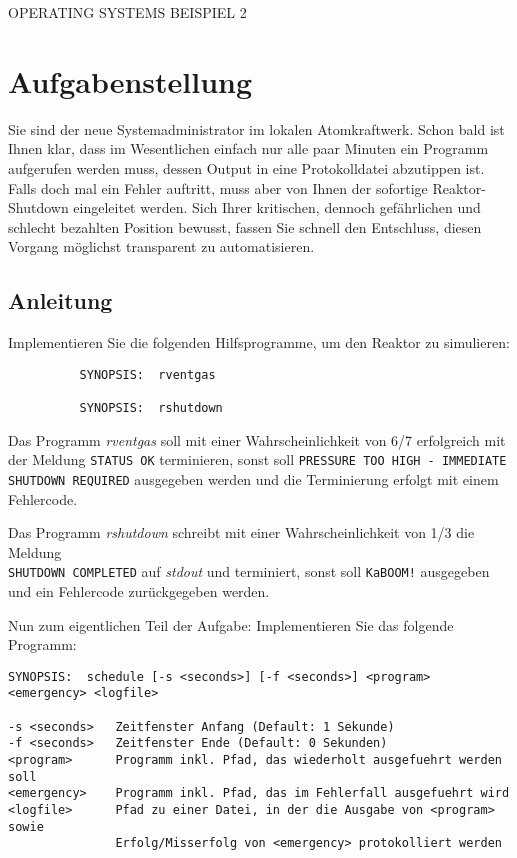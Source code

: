 \documentclass{article}
\begin{document}
\begin{center}
\begin{Large}
OPERATING SYSTEMS BEISPIEL 2
\end{Large}
\end{center}
\section*{Aufgabenstellung}

Sie sind der neue Systemadministrator im lokalen Atomkraftwerk. Schon bald ist
Ihnen klar, dass im Wesentlichen einfach nur alle paar Minuten ein Programm
aufgerufen werden muss, dessen Output in eine Protokolldatei abzutippen ist.
Falls doch mal ein Fehler auftritt, muss aber von Ihnen der sofortige
Reaktor-Shutdown eingeleitet werden. Sich Ihrer kritischen, dennoch gefährlichen
und schlecht bezahlten Position bewusst, fassen Sie schnell den Entschluss,
diesen Vorgang möglichst transparent zu automatisieren.

\subsection*{Anleitung}
Implementieren Sie die folgenden Hilfsprogramme, um den Reaktor zu simulieren:

\begin{verbatim}
          SYNOPSIS:  rventgas

          SYNOPSIS:  rshutdown
\end{verbatim}

Das Programm \emph{rventgas} soll mit einer Wahrscheinlichkeit von 6/7
erfolgreich mit der Meldung \verb_STATUS OK_ terminieren, sonst soll
\verb_PRESSURE TOO HIGH - IMMEDIATE SHUTDOWN REQUIRED_ ausgegeben werden und die
Terminierung erfolgt mit einem Fehlercode.

Das Programm \emph{rshutdown} schreibt mit einer Wahrscheinlichkeit von 1/3 die
Meldung\\
\verb_SHUTDOWN COMPLETED_ auf \emph{stdout} und terminiert, sonst soll
\verb_KaBOOM!_ ausgegeben und ein Fehlercode zurückgegeben werden.

Nun zum eigentlichen Teil der Aufgabe: Implementieren Sie das folgende Programm:

\begin{verbatim}
SYNOPSIS:  schedule [-s <seconds>] [-f <seconds>] <program> <emergency> <logfile>

-s <seconds>   Zeitfenster Anfang (Default: 1 Sekunde)
-f <seconds>   Zeitfenster Ende (Default: 0 Sekunden)
<program>      Programm inkl. Pfad, das wiederholt ausgefuehrt werden soll
<emergency>    Programm inkl. Pfad, das im Fehlerfall ausgefuehrt wird
<logfile>      Pfad zu einer Datei, in der die Ausgabe von <program> sowie
               Erfolg/Misserfolg von <emergency> protokolliert werden
\end{verbatim}
\end{document}
